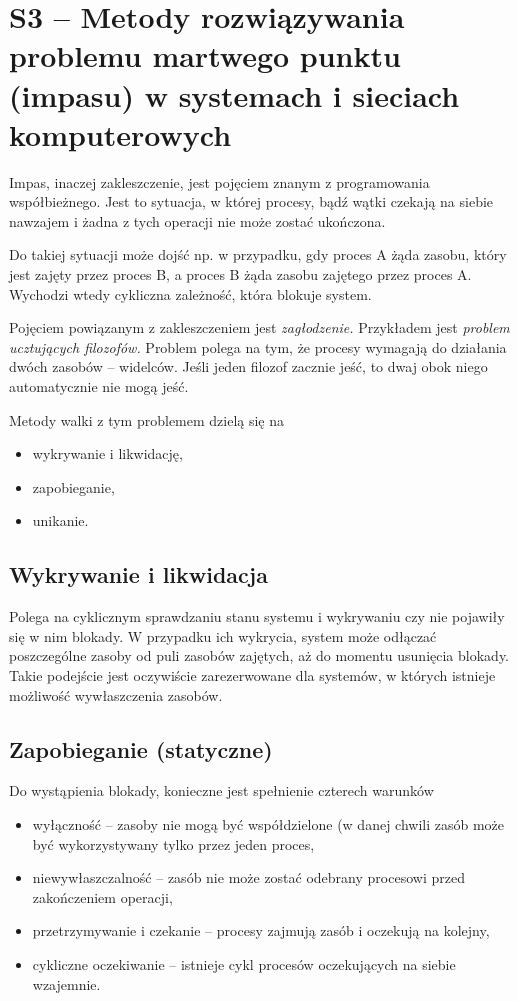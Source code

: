 \section{S3 -- Metody rozwiązywania problemu martwego punktu (impasu) w systemach i sieciach komputerowych}

Impas, inaczej zakleszczenie, jest pojęciem znanym z programowania współbieżnego.
Jest to sytuacja, w której procesy, bądź wątki czekają na siebie nawzajem i żadna z tych operacji nie może zostać ukończona.

Do takiej sytuacji może dojść np. w przypadku, gdy proces A żąda zasobu, który jest zajęty przez proces B, a proces B żąda zasobu zajętego przez proces A.
Wychodzi wtedy cykliczna zależność, która blokuje system.

Pojęciem powiązanym z zakleszczeniem jest \textit{zagłodzenie.}
Przykładem jest \textit{problem ucztujących filozofów.}
Problem polega na tym, że procesy wymagają do działania dwóch zasobów -- widelców.
Jeśli jeden filozof zacznie jeść, to dwaj obok niego automatycznie nie mogą jeść.

Metody walki z tym problemem dzielą się na
\begin{itemize}
	\item{wykrywanie i likwidację,}
	\item{zapobieganie,}
	\item{unikanie.}
\end{itemize}

\subsection{Wykrywanie i likwidacja}
Polega na cyklicznym sprawdzaniu stanu systemu i wykrywaniu czy nie pojawiły się w nim blokady.
W przypadku ich wykrycia, system może odłączać poszczególne zasoby od puli zasobów zajętych, aż do momentu usunięcia blokady.
Takie podejście jest oczywiście zarezerwowane dla systemów, w których istnieje możliwość wywłaszczenia zasobów.

\subsection{Zapobieganie (statyczne)}
Do wystąpienia blokady, konieczne jest spełnienie czterech warunków
\begin{itemize}
	\item{wyłączność -- zasoby nie mogą być współdzielone (w danej chwili zasób może być wykorzystywany tylko przez jeden proces,}
	\item{niewywłaszczalność -- zasób nie może zostać odebrany procesowi przed zakończeniem operacji,}
	\item{przetrzymywanie i czekanie -- procesy zajmują zasób i oczekują na kolejny,}
	\item{cykliczne oczekiwanie -- istnieje cykl procesów oczekujących na siebie wzajemnie.}
\end{itemize}


